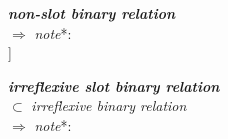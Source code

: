 \documentclass{article}
\begin{document}
\begin{multicols}{2}
\begin{tabbing}
 \textbf{\textit{non-slot binary relation}} \\ $\Rightarrow$ \hspace{0.5cm} \= \textit{note}*: \\ ]
\end{tabbing}

\begin{tabbing}
 \textbf{\textit{irreflexive slot binary relation}} \\ $\subset$ \hspace{0.5cm} \= \textit{irreflexive binary relation}
 \\ $\Rightarrow$ \hspace{0.5cm} \= 

 \textit{note}*: 
\end{tabbing}



\end{multicols}
\end{document}
